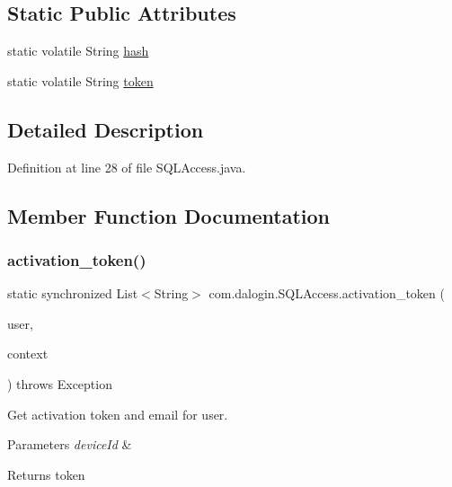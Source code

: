 \subsection*{Static Public Attributes}
\begin{DoxyCompactItemize}
\item 
static volatile String \hyperlink{classcom_1_1dalogin_1_1_s_q_l_access_ae23b949fc74966a8c7dd9e3a888b76c0}{hash}
\item 
static volatile String \hyperlink{classcom_1_1dalogin_1_1_s_q_l_access_ac34e9644bffccef034598dd30c5f6d80}{token}
\end{DoxyCompactItemize}


\subsection{Detailed Description}


Definition at line 28 of file S\+Q\+L\+Access.\+java.



\subsection{Member Function Documentation}
\mbox{\label{classcom_1_1dalogin_1_1_s_q_l_access_a6b6e51a792e4ba4e57a625f04f277db4}} 
\subsubsection{\texorpdfstring{activation\+\_\+token()}{activation\_token()}}
{\footnotesize\ttfamily static synchronized List$<$String$>$ com.\+dalogin.\+S\+Q\+L\+Access.\+activation\+\_\+token (\begin{DoxyParamCaption}\item[{String}]{user,  }\item[{Servlet\+Context}]{context }\end{DoxyParamCaption}) throws Exception\hspace{0.3cm}{\ttfamily [static]}}

Get activation token and email for user.


\begin{DoxyParams}{Parameters}
{\em device\+Id} & \\
\hline
\end{DoxyParams}
\begin{DoxyReturn}{Returns}
token 
\end{DoxyReturn}

